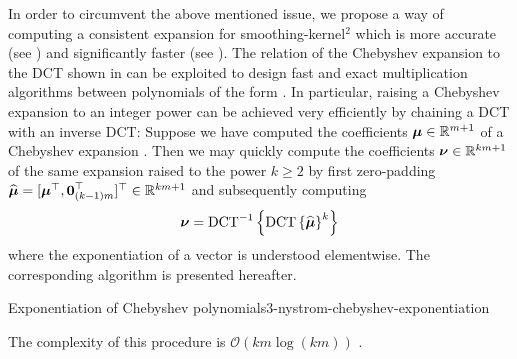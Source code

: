 In order to circumvent the above mentioned issue, we propose a way of computing
a consistent expansion for \gls{smoothing-kernel}$^2$ which is more accurate
(see ) and significantly faster
(see ).
The relation of the Chebyshev expansion to the \gls{DCT} shown in 
can be exploited to design fast and exact multiplication algorithms between polynomials
of the form  \cite[proposition~3.1]{baszenski1997cosine}.
In particular, raising a Chebyshev expansion to an integer power can be achieved
very efficiently by chaining a \gls{DCT} with an inverse \gls{DCT}:
Suppose we have computed the coefficients $\boldsymbol{\mu} \in \mathbb{R}^{m+1}$
of a Chebyshev expansion .
Then we may quickly compute the coefficients $\boldsymbol{\nu} \in \mathbb{R}^{km+1}$
of the same expansion raised to the power $k \geq 2$ by first zero-padding
$\widehat{\boldsymbol{\mu}} = [\boldsymbol{\mu}^{\top}, \boldsymbol{0}_{(k-1)m}^{\top}]^{\top} \in \mathbb{R}^{km+1}$
and subsequently computing
\begin{equation}
    \boldsymbol{\nu} = \operatorname{DCT}^{-1}\left\{ \operatorname{DCT}\left\{\widehat{\boldsymbol{\mu}}\right\}^{k} \right\}
    \label{equ:3-nystrom-chebyshev-potentiate-coefficients}
\end{equation}
where the exponentiation of a vector is understood elementwise.
The corresponding algorithm is presented hereafter.
\begin{algo}{Exponentiation of Chebyshev polynomials}{3-nystrom-chebyshev-exponentiation}
    
\end{algo}
The complexity of this procedure is $\mathcal{O}(km \log(km))$ \cite{makhoul1980fct}.\\
\begin{table}[ht]
    \caption{Runtime comparison of the two approaches with which the coefficients
    of the Chebyshev expansion of a function. We average over 7 runs of the
    algorithms and repeat these runs 100 times to form the mean and standard
    deviation which are given in the below table. We refer to the interpolation
    of \gls{smoothing-kernel}$^{2}$ with \cite[algorithm~1]{lin2017randomized} as \enquote{quadrature},
    to the interpolation of \gls{smoothing-kernel}$^{2}$ with  as \enquote{DCT},
    and finally to the fast squaring algorithm  as \enquote{squaring}.
    For each algorithm, we interpolate \gls{smoothing-kernel} with \gls{smoothing-parameter} $=0.05$,
    at \gls{num-evaluation-points}$=1000$ points, for various values of \gls{chebyshev-degree}.}
    \label{tab:3-nystrom-timing-squared-interpolation}
    
\end{table}

